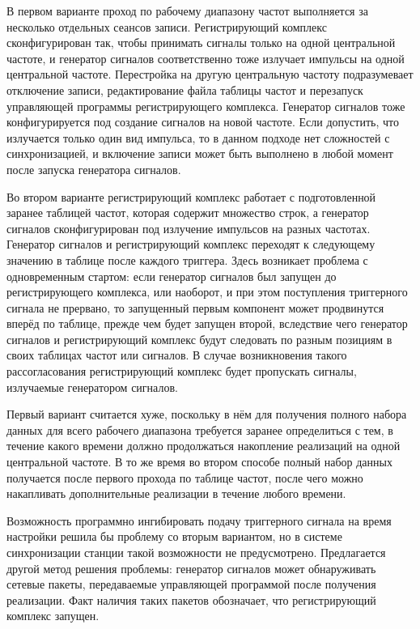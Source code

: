 \documentclass{report}
\begin{document}
В первом варианте проход по рабочему диапазону частот выполняется за несколько отдельных сеансов записи. Регистрирующий комплекс сконфигурирован так, чтобы принимать сигналы только на одной центральной частоте, и генератор сигналов соответственно тоже излучает импульсы на одной центральной частоте. Перестройка на другую центральную частоту подразумевает отключение записи, редактирование файла таблицы частот и перезапуск управляющей программы регистрирующего комплекса. Генератор сигналов тоже конфигурируется под создание сигналов на новой частоте. Если допустить, что излучается только один вид импульса, то в данном подходе нет сложностей с синхронизацией, и включение записи может быть выполнено в любой момент после запуска генератора сигналов.

Во втором варианте регистрирующий комплекс работает с подготовленной заранее таблицей частот, которая содержит множество строк, а генератор сигналов сконфигурирован под излучение импульсов на разных частотах. Генератор сигналов и регистрирующий комплекс переходят к следующему значению в таблице после каждого триггера. Здесь возникает проблема с одновременным стартом: если генератор сигналов был запущен до регистрирующего комплекса, или наоборот, и при этом поступления триггерного сигнала не прервано, то запущенный первым компонент может продвинутся вперёд по таблице, прежде чем будет запущен второй, вследствие чего генератор сигналов и регистрирующий комплекс будут следовать по разным позициям в своих таблицах частот или сигналов. В случае возникновения такого рассогласования регистрирующий комплекс будет пропускать сигналы, излучаемые генератором сигналов.

Первый вариант считается хуже, поскольку в нём для получения полного набора данных для всего рабочего диапазона требуется заранее определиться с тем, в течение какого времени должно продолжаться накопление реализаций на одной центральной частоте. В то же время во втором способе полный набор данных получается после первого прохода по таблице частот, после чего можно накапливать дополнительные реализации в течение любого времени.

Возможность программно ингибировать подачу триггерного сигнала на время настройки решила бы проблему со вторым вариантом, но в системе синхронизации станции такой возможности не предусмотрено. Предлагается другой метод решения проблемы: генератор сигналов может обнаруживать сетевые пакеты, передаваемые управляющей программой после получения реализации. Факт наличия таких пакетов обозначает, что регистрирующий комплекс запущен.
\end{document}
